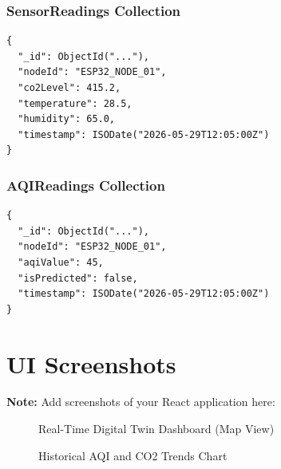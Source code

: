 \documentclass[a4paper, 12pt]{report}
\begin{document}
\subsection*{SensorReadings Collection}
\begin{verbatim}
{
  "_id": ObjectId("..."),
  "nodeId": "ESP32_NODE_01",
  "co2Level": 415.2,
  "temperature": 28.5,
  "humidity": 65.0,
  "timestamp": ISODate("2026-05-29T12:05:00Z")
}
\end{verbatim}
\subsection*{AQIReadings Collection}
\begin{verbatim}
{
  "_id": ObjectId("..."),
  "nodeId": "ESP32_NODE_01",
  "aqiValue": 45,
  "isPredicted": false,
  "timestamp": ISODate("2026-05-29T12:05:00Z")
}
\end{verbatim}
\chapter{UI Screenshots}
\textbf{Note:} Add screenshots of your React application here:
\begin{figure}[H]
	\centering
	\caption{Real-Time Digital Twin Dashboard (Map View)}
\end{figure}
\begin{figure}[H]
	\centering
	\caption{Historical AQI and CO2 Trends Chart}
\end{figure}
\end{document}
